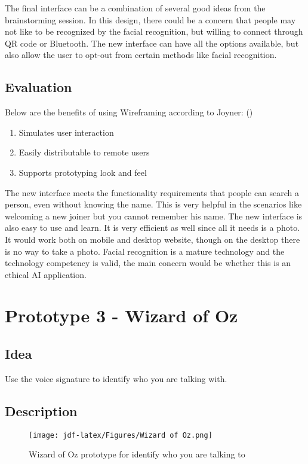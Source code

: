 \documentclass[
	letterpaper, %
]{jdf}
\begin{document}
The final interface can be a combination of several good ideas from the brainstorming session. In this design, there could be a concern that people may not like to be recognized by the facial recognition, but willing to connect through QR code or Bluetooth. The new interface can have all the options available, but also allow the user to opt-out from certain methods like facial recognition.

\subsection{Evaluation}
Below are the benefits of using Wireframing according to Joyner: (\cite{joyner2016b})

\begin{enumerate}
    \item Simulates user interaction
    \item Easily distributable to remote users
    \item Supports prototyping look and feel
\end{enumerate}

The new interface meets the functionality requirements that people can search a person, even without knowing the name. This is very helpful in the scenarios like welcoming a new joiner but you cannot remember his name. The new interface is also easy to use and learn. It is very efficient as well since all it needs is a photo. It would work both on mobile and desktop website, though on the desktop there is no way to take a photo. Facial recognition is a mature technology and the technology competency is valid, the main concern would be whether this is an ethical AI application.

\section{Prototype 3 - Wizard of Oz}

\subsection{Idea}
Use the voice signature to identify who you are talking with.

\subsection{Description}

\begin{figure}[h]
	\centering
	\texttt{[image: jdf-latex/Figures/Wizard of Oz.png]}
	\caption{Wizard of Oz prototype for identify who you are talking to}
	\label{fig:wizard}
\end{figure}
\end{document}
